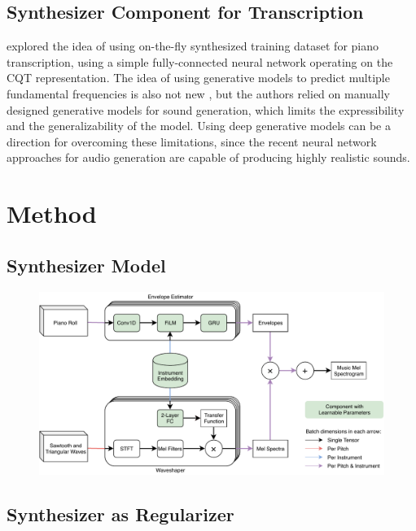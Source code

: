 \subsection{Synthesizer Component for Transcription}

 explored the idea of using on-the-fly synthesized training dataset for piano transcription, using a simple fully-connected neural network operating on the CQT representation.
The idea of using generative models to predict multiple fundamental frequencies is also not new \cite{dubois2005harmonic,cemgil2006generative}, but the authors relied on manually designed generative models for sound generation, which limits the expressibility and the generalizability of the model.
Using deep generative models can be a direction for overcoming these limitations, since the recent neural network approaches for audio generation are capable of producing highly realistic sounds.

\cite{choi2019drum}


\section{Method}

\subsection{Synthesizer Model}

\begin{figure}
	\centering
	\includegraphics[width=\textwidth]{synthesizer-architecture.pdf}
	\caption{}\label{fig:synthesizer-architecture}
\end{figure}


\subsection{Synthesizer as Regularizer}

